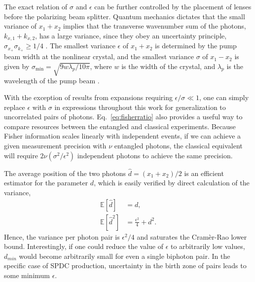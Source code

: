 The exact relation of $\sigma$ and $\epsilon$ can be further controlled by the placement of lenses before the polarizing beam splitter.  Quantum mechanics dictates that the small variance of $x_1 + x_2$ implies that the transverse wavenumber sum of the photons, $k_{x,1}+k_{x,2}$, has a large variance, since they obey an uncertainty principle, $\sigma_{x_+} \sigma_{k_+} \ge 1/4$ \cite{Schneeloch2015}.  The smallest variance $\epsilon$ of $x_1+x_2$ is determined by the pump beam width at the nonlinear crystal, and the smallest variance $\sigma$ of $x_1-x_2$ is given by $\sigma_{\min} = \sqrt{9 w \lambda_p/10 \pi}$, where $w$ is the width of the crystal, and $\lambda_p$ is the wavelength of the pump beam \cite{Schneeloch2015}.



With the exception of results from expansions requiring $\epsilon/\sigma \ll 1$, one can simply replace $\epsilon$ with $\sigma$ in expressions throughout this work for generalization to uncorrelated pairs of photons.
Eq.~\eqref{eq:fisherratio} also provides a useful way to compare resources between the entangled and classical experiments.  Because Fisher information scales linearly with independent events, if we can achieve a given measurement precision with $\nu$ entangled photons, the classical equivalent will require $2 \nu (\sigma^2/\epsilon^2) $ independent photons to achieve the same precision.

The average position of the two photons $\hat{d} = (x_1 + x_2)/2$ is an efficient estimator for the parameter $d$, which is easily verified by direct calculation of the variance,
\begin{align}
	\mathbb{E}[\hat{d}] &= d, \\
	\mathbb{E}[\hat{d}^2] &= \frac{\epsilon^2}{4} + d^2.	
\end{align}
Hence, the variance per photon pair is $\epsilon^2/4$ and saturates the Cram\`{e}r-Rao lower bound.
Interestingly, if one could reduce the value of $\epsilon$ to arbitrarily low values, $d_{min}$ would become arbitrarily small for even a single biphoton pair. In the specific case of SPDC production, uncertainty in the birth zone of pairs leads to some minimum $\epsilon$.

